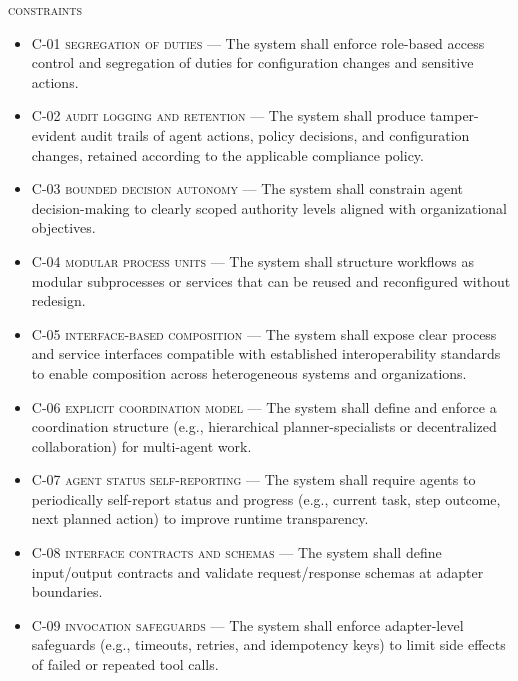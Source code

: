 \begin{footnotesize}
    \noindent \textsc{constraints}
    \begin{itemize}
        \item \textsc{C-01 segregation of duties} --- The system shall enforce role-based access control and segregation of duties for configuration changes and sensitive actions.
        \item \textsc{C-02 audit logging and retention} --- The system shall produce tamper-evident audit trails of agent actions, policy decisions, and configuration changes, retained according to the applicable compliance policy.
        \item \textsc{C-03 bounded decision autonomy} --- The system shall constrain agent decision-making to clearly scoped authority levels aligned with organizational objectives.
        \item \textsc{C-04 modular process units} --- The system shall structure workflows as modular subprocesses or services that can be reused and reconfigured without redesign.
        \item \textsc{C-05 interface-based composition} --- The system shall expose clear process and service interfaces compatible with established interoperability standards to enable composition across heterogeneous systems and organizations.
        \item \textsc{C-06 explicit coordination model} --- The system shall define and enforce a coordination structure (e.g., hierarchical planner-specialists or decentralized collaboration) for multi-agent work.
        \item \textsc{C-07 agent status self-reporting} --- The system shall require agents to periodically self-report status and progress (e.g., current task, step outcome, next planned action) to improve runtime transparency.
        \item \textsc{C-08 interface contracts and schemas} --- The system shall define input/output contracts and validate request/response schemas at adapter boundaries.
        \item \textsc{C-09 invocation safeguards} --- The system shall enforce adapter-level safeguards (e.g., timeouts, retries, and idempotency keys) to limit side effects of failed or repeated tool calls.
    \end{itemize}
\end{footnotesize}

